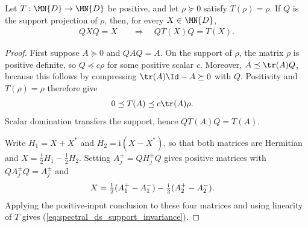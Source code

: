 \begin{theorem}%
    \label{thm:stationarySupport_restriction}
    \leanok
    Let $T:\MN{D}\to\MN{D}$ be positive, and let
    $\rho\succeq0$ satisfy $T(\rho)=\rho$. If $Q$ is the support projection
    of $\rho$, then, for every $X\in\MN{D}$,
    \begin{align}
        QXQ=X
         & \quad\Longrightarrow\quad QT(X)Q=T(X).
        \label{eq:spectral_ds_support_invariance}
    \end{align}
\end{theorem}

\begin{proof}
    \leanok
    First suppose $A\succeq0$ and $QAQ=A$. On the support of $\rho$, the
    matrix $\rho$ is positive definite, so $Q\preceq c\rho$ for some
    positive scalar $c$. Moreover, $A\preceq\tr(A)Q$, because this follows
    by compressing $\tr(A)\Id-A\succeq0$ with $Q$. Positivity and
    $T(\rho)=\rho$ therefore give
    \begin{align}
        0
         & \preceq T(A)\preceq c\tr(A)\rho.
        \notag
    \end{align}
    Scalar domination transfers the support, hence $QT(A)Q=T(A)$.

    Write $H_1=X+X^*$ and $H_2=\mathrm{i}(X-X^*)$, so that both matrices
    are Hermitian and $X=\tfrac12H_1-\tfrac{\mathrm{i}}2H_2$. Setting
    $A_j^\pm=QH_j^\pm Q$ gives positive matrices with
    $QA_j^\pm Q=A_j^\pm$ and
    \begin{align}
        X
         & =\tfrac12(A_1^+-A_1^-)
        -\tfrac{\mathrm{i}}2(A_2^+-A_2^-).
        \notag
    \end{align}
    Applying the positive-input conclusion to these four matrices and using
    linearity of $T$ gives (\ref{eq:spectral_ds_support_invariance}).
\end{proof}

